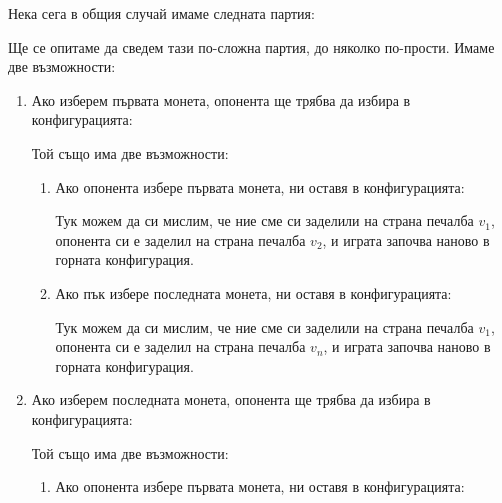 Нека сега в общия случай имаме следната партия:
\begin{center}
      \dt{$\dots$}  
\end{center}
Ще се опитаме да сведем тази по-сложна партия, до няколко по-прости.
Имаме две възможности:
\begin{enumerate}
    \item Ако изберем първата монета, опонента ще трябва да избира в конфигурацията:
          \begin{center}
                \dt{$\dots$}  
          \end{center}
          Той също има две възможности:
          \begin{enumerate}
              \item Ако опонента избере първата монета, ни оставя в конфигурацията:
                    \begin{center}
                          \dt{$\dots$}  
                    \end{center}
                    Тук можем да си мислим, че ние сме си заделили на страна печалба $v_1$, опонента си е заделил на страна печалба $v_2$, и играта започва наново в горната конфигурация.
              \item Ако пък избере последната монета, ни оставя в конфигурацията:
                    \begin{center}
                          \dt{$\dots$}  
                    \end{center}
                    Тук можем да си мислим, че ние сме си заделили на страна печалба $v_1$, опонента си е заделил на страна печалба $v_n$, и играта започва наново в горната конфигурация.
          \end{enumerate}
    \item Ако изберем последната монета, опонента ще трябва да избира в конфигурацията:
          \begin{center}
                \dt{$\dots$}  
          \end{center}
          Той също има две възможности:
          \begin{enumerate}
              \item Ако опонента избере първата монета, ни оставя в конфигурацията:
                    \begin{center}

\end{center}
\end{enumerate}
\end{enumerate}
